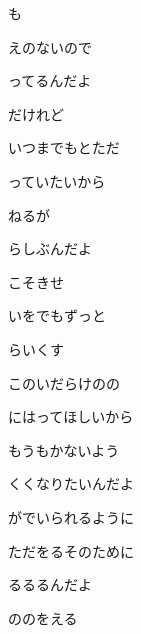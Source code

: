 \documentclass[a4paper,tate,twocolumn,12pt]{ltjtarticle}
\begin{document}
\begin{flushleft}
\vspace{2em}

\noindent\begin{minipage}{\linewidth}
も

えのないので

ってるんだよ

だけれど

いつまでもとただ

っていたいから

ねるが

らしぶんだよ

こそきせ
\end{minipage}

\vspace{2em}

\noindent\begin{minipage}{\linewidth}
いをでもずっと

らいくす

このいだらけのの

にはってほしいから

もうもかないよう

くくなりたいんだよ

がでいられるように
\end{minipage}

\vspace{2em}

\noindent\begin{minipage}{\linewidth}
ただをるそのために

るるるんだよ

ののをえる
\end{minipage}

\end{flushleft}
\end{document}
